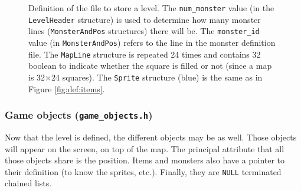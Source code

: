 \documentclass[12pt,a4paper]{article}
\begin{document}
\begin{figure}
\caption{Definition of the file to store a level. The \texttt{num\_monster} value (in the \texttt{LevelHeader} structure) is used to determine how many monster lines (\texttt{MonsterAndPos} structures) there will be. The \texttt{monster\_id} value (in \texttt{MonsterAndPos}) refers to the line in the monster definition file. The \texttt{MapLine} structure is repeated 24 times and contains 32 boolean to indicate whether the square is filled or not (since a map is 32$\times$24 squares). The \texttt{Sprite} structure (blue) is the same as in Figure \ref{fig:def:items}.}
\label{fig:def:level}
\end{figure}

\subsubsection{Game objects (\texttt{game\_objects.h})}

Now that the level is defined, the different objects may be as well. Those objects will appear on the screen, on top of the map. The principal attribute that all those objects share is the position. Items and monsters also have a pointer to their definition (to know the sprites, etc.). Finally, they are \texttt{NULL} terminated chained lists.
\end{document}
